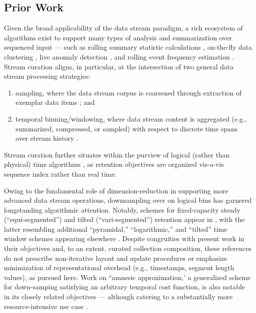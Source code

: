 \subsection{Prior Work}

Given the broad applicability of the data stream paradigm, a rich ecosystem of algorithms exist to support many types of analysis and summarization over sequenced input --- such as rolling summary statistic calculations \citep{lin2004continuously}, on-the-fly data clustering \citep{silva2013data}, live anomaly detection \citep{cai2004maids}, and rolling event frequency estimation \citep{manku2002approximate}.
Stream curation aligns, in particular, at the intersection of two general data stream processing strategies:
\begin{enumerate}
\item sampling, where the data stream corpus is coarsened through extraction of exemplar data items \citep{sibai2016sampling}; and
\item temporal binning/windowing, where data stream content is aggregated (e.g., summarized, compressed, or sampled) with respect to discrete time spans over stream history \citep{gama2007data}.
\end{enumerate}
Stream curation further situates within the purview of logical (rather than physical) time algorithms \citep{sibai2016sampling}, as retention objectives are organized vis-a-vis sequence index rather than real time.

Owing to the fundamental role of dimension-reduction in supporting more advanced data stream operations, downsampling over on logical bins has garnered longstanding algorithmic attention.
Notably, schemes for fixed-capacity steady (``equi-segmented'') and tilted (``vari-segmented'') retention appear in \citep{zhao2005generalized}, with the latter resembling additional ``pyramidal,'' ``logarithmic,'' and ``tilted'' time window schemes appearing elsewhere \citep{aggarwal2003framework,han2005stream,giannella2003mining,phithakkitnukoon2010recent}.
Despite congruities with present work in their objectives and, to an extent, curated collection composition, these references do not prescribe non-iterative layout and update procedures or emphasize minimization of representational overhead (e.g., timestamps, segment length values), as pursued here.
Work on ``amnesic approximation,' a generalized scheme for down-samping satisfying an arbitrary temporal cost function, is also notable in its closely related objectives --- although catering to a substantially more resource-intensive use case \cite{palpanas2004online}.

